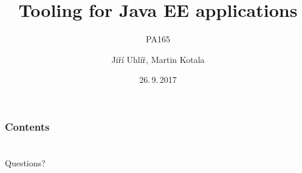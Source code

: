 \documentclass[pdf,compress]{beamer}
\title{Tooling for Java EE applications}
\subtitle{PA165}
\date{26.\,9.\,2017}
\author{Jiří Uhlíř, Martin Kotala}
\begin{document}
\frame{\titlepage}

\section[]{}
\begin{frame}
\frametitle{Contents}
\tableofcontents[hideallsubsections]
\end{frame}








\section*{}
\begin{frame}
\begin{center}
\Huge Questions?
\end{center}
\end{frame}
\end{document}
